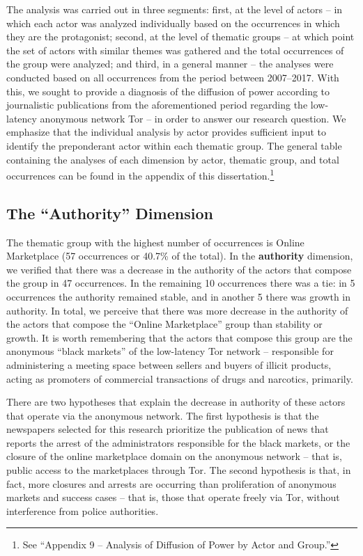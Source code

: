 The analysis was carried out in three segments: first, at the level of actors -- in which each actor was analyzed individually based on the occurrences in which they are the protagonist; second, at the level of thematic groups -- at which point the set of actors with similar themes was gathered and the total occurrences of the group were analyzed; and third, in a general manner -- the analyses were conducted based on all occurrences from the period between 2007--2017. With this, we sought to provide a diagnosis of the diffusion of power according to journalistic publications from the aforementioned period regarding the low-latency anonymous network Tor -- in order to answer our research question. We emphasize that the individual analysis by actor provides sufficient input to identify the preponderant actor within each thematic group. The general table containing the analyses of each dimension by actor, thematic group, and total occurrences can be found in the appendix of this dissertation.\footnote{See ``Appendix 9 -- Analysis of Diffusion of Power by Actor and Group.''}

\subsection{The ``Authority'' Dimension}

The thematic group with the highest number of occurrences is Online Marketplace (57 occurrences or 40.7\% of the total). In the \textbf{authority} dimension, we verified that there was a decrease in the authority of the actors that compose the group in 47 occurrences. In the remaining 10 occurrences there was a tie: in 5 occurrences the authority remained stable, and in another 5 there was growth in authority. In total, we perceive that there was more decrease in the authority of the actors that compose the ``Online Marketplace'' group than stability or growth. It is worth remembering that the actors that compose this group are the anonymous ``black markets'' of the low-latency Tor network -- responsible for administering a meeting space between sellers and buyers of illicit products, acting as promoters of commercial transactions of drugs and narcotics, primarily.

There are two hypotheses that explain the decrease in authority of these actors that operate via the anonymous network. The first hypothesis is that the newspapers selected for this research prioritize the publication of news that reports the arrest of the administrators responsible for the black markets, or the closure of the online marketplace domain on the anonymous network -- that is, public access to the marketplaces through Tor. The second hypothesis is that, in fact, more closures and arrests are occurring than proliferation of anonymous markets and success cases -- that is, those that operate freely via Tor, without interference from police authorities.

